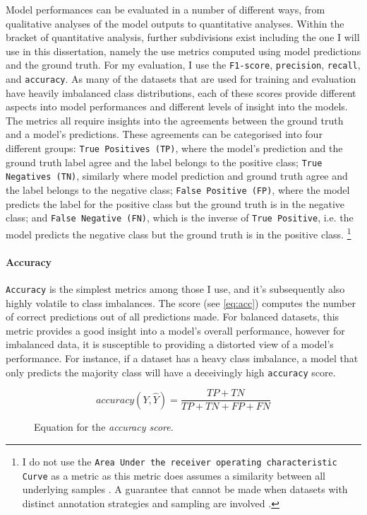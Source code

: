 Model performances can be evaluated in a number of different ways, from qualitative analyses of the model outputs to quantitative analyses. Within the bracket of quantitative analysis, further subdivisions exist including the one I will use in this dissertation, namely the use metrics computed using model predictions and the ground truth.
For my evaluation, I use the \texttt{F1-score}, \texttt{precision}, \texttt{recall}, and \texttt{accuracy}. As many of the datasets that are used for training and evaluation have heavily imbalanced class distributions, each of these scores provide different aspects into model performances and different levels of insight into the models.
The metrics all require insights into the agreements between the ground truth and a model's predictions. These agreements can be categorised into four different groups:
\texttt{True Positives (TP)}, where the model's prediction and the ground truth label agree and the label belongs to the positive class; \texttt{True Negatives (TN)}, similarly where model prediction and ground truth agree and the label belongs to the negative class; \texttt{False Positive (FP)}, where the model predicts the label for the positive class but the ground truth is in the negative class; and \texttt{False Negative (FN)}, which is the inverse of \texttt{True Positive}, i.e. the model predicts the negative class but the ground truth is in the positive class.
\footnote{I do not use the \texttt{Area Under the receiver operating characteristic Curve} as a metric as this metric does assumes a similarity between all underlying samples \citep{Stevenson:2021}. A guarantee that cannot be made when datasets with distinct annotation strategies and sampling are involved .}

\paragraph{Accuracy}
\texttt{Accuracy} is the simplest metrics among those I use, and it's subsequently also highly volatile to class imbalances.
The score (see \cref{eq:acc}) computes the number of correct predictions out of all predictions made. For balanced datasets, this metric provides a good insight into a model's overall performance, however for imbalanced data, it is susceptible to providing a distorted view of a model's performance. For instance, if a dataset has a heavy class imbalance, a model that only predicts the majority class will have a deceivingly high \texttt{accuracy} score.

\begin{figure}[h]
  \begin{equation}\label{eq:acc}
    accuracy(Y,\hat{Y}) = \frac{TP + TN}{TP + TN + FP + FN}
  \end{equation}
  \caption{Equation for the \textit{accuracy score}.}
\end{figure}

